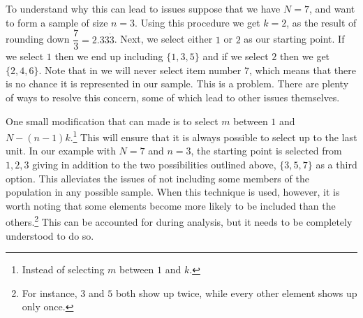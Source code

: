 \documentclass[
  letterpaper,
  DIV=11,
  numbers=noendperiod]{scrreprt}
\theoremstyle{definition}
\theoremstyle{definition}
\theoremstyle{definition}
\theoremstyle{remark}
\begin{document}
To understand why this can lead to issues suppose that we have \(N=7\),
and want to form a sample of size \(n=3\). Using this procedure we get
\(k=2\), as the result of rounding down \(\dfrac{7}{3}=2.33\dot3\).
Next, we select either \(1\) or \(2\) as our starting point. If we
select \(1\) then we end up including \(\{1,3,5\}\) and if we select
\(2\) then we get \(\{2,4,6\}\). Note that in we will never select item
number \(7\), which means that there is no chance it is represented in
our sample. This is a problem. There are plenty of ways to resolve this
concern, some of which lead to other issues themselves.

One small modification that can made is to select \(m\) between \(1\)
and \(N-(n-1)k\).\footnote{Instead of selecting \(m\) between \(1\) and
  \(k\).} This will ensure that it is always possible to select up to
the last unit. In our example with \(N=7\) and \(n=3\), the starting
point is selected from \(1,2,3\) giving in addition to the two
possibilities outlined above, \(\{3,5,7\}\) as a third option. This
alleviates the issues of not including some members of the population in
any possible sample. When this technique is used, however, it is worth
noting that some elements become more likely to be included than the
others.\footnote{For instance, \(3\) and \(5\) both show up twice, while
  every other element shows up only once.} This can be accounted for
during analysis, but it needs to be completely understood to do so.
\end{document}
